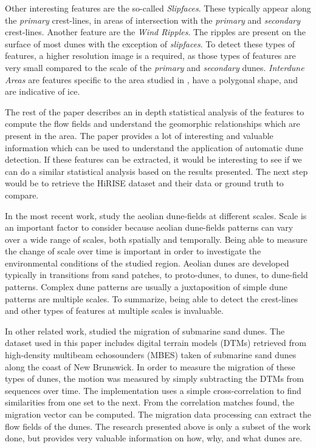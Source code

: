 Other interesting features are the so-called \emph{Slipfaces}. These typically appear along the \emph{primary} crest-lines, in areas of intersection with the \emph{primary} and \emph{secondary} crest-lines. Another feature are the \emph{Wind Ripples}. The ripples are present on the surface of most dunes with the exception	of \emph{slipfaces}. To detect	these types of features, a higher resolution image is a required, as those types of features are very small compared to the scale of the \emph{primary} and \emph{secondary}	dunes. \emph{Interdune Areas} are features specific to the area studied in \cite{Ewing_Peyret_Kocurek_Bourke},	have a polygonal shape, and are indicative of ice.

The rest of the paper describes an in depth statistical analysis of the features to compute the flow fields and understand the geomorphic relationships which are present in the area. The paper \cite{Ewing_Peyret_Kocurek_Bourke} provides a lot of interesting and valuable information which can be used to understand the application of automatic dune detection. If these features can be extracted, it would be interesting to see if we can do a similar statistical analysis based on the results presented. The next step would be to retrieve the HiRISE dataset and their data or ground truth to compare.

In the most recent work, \cite{Multi_spatial_analysis_aeolian_dune_field_patterns} study the aeolian dune-fields at different scales. Scale is an important factor to consider because aeolian dune-fields patterns can vary over	a wide range of scales, both spatially and temporally. Being able to measure the change of scale over time is important in order to investigate the environmental conditions of the studied region. Aeolian	dunes are developed typically in transitions from sand patches, to proto-dunes, to dunes, to dune-field patterns. Complex dune patterns are usually a juxtaposition of simple dune patterns are multiple scales. To summarize, being able to detect the crest-lines and other types of features at multiple scales is invaluable.

In other related work, \cite{Application_spatial_cross_correlation_detection_submarine_dunes} studied the migration of submarine sand dunes. The dataset used in this paper includes digital terrain models (DTMs) retrieved from high-density multibeam echosounders (MBES) taken of submarine sand dunes along the coast of New Brunswick. In order to measure the migration of these types of dunes, the motion was measured by simply subtracting the DTMs from sequences over time. The implementation uses a simple cross-correlation to find similarities from one set to the next. From the correlation matches found, the migration vector can be computed. The migration data processing can extract the flow fields of the dunes. The research presented above is only a subset of the work done, but provides very valuable information on how, why, and what dunes are. 

